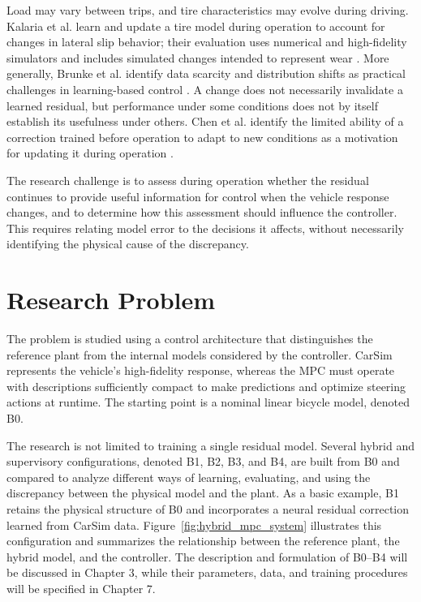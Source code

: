 \documentclass[12pt,a4paper]{report}
\begin{document}
Load may vary between trips, and tire characteristics may evolve during driving. Kalaria et al. learn and update a tire model during operation to account for changes in lateral slip behavior; their evaluation uses numerical and high-fidelity simulators and includes simulated changes intended to represent wear \cite{Kalaria2024Adaptive}. More generally, Brunke et al. identify data scarcity and distribution shifts as practical challenges in learning-based control \cite{Brunke2022Safe}. A change does not necessarily invalidate a learned residual, but performance under some conditions does not by itself establish its usefulness under others. Chen et al. identify the limited ability of a correction trained before operation to adapt to new conditions as a motivation for updating it during operation \cite{Chen2026Hybrid}.

The research challenge is to assess during operation whether the residual continues to provide useful information for control when the vehicle response changes, and to determine how this assessment should influence the controller. This requires relating model error to the decisions it affects, without necessarily identifying the physical cause of the discrepancy.


\section{Research Problem}

The problem is studied using a control architecture that distinguishes the reference plant from the internal models considered by the controller. CarSim represents the vehicle's high-fidelity response, whereas the MPC must operate with descriptions sufficiently compact to make predictions and optimize steering actions at runtime. The starting point is a nominal linear bicycle model, denoted B0.

The research is not limited to training a single residual model. Several hybrid and supervisory configurations, denoted B1, B2, B3, and B4, are built from B0 and compared to analyze different ways of learning, evaluating, and using the discrepancy between the physical model and the plant. As a basic example, B1 retains the physical structure of B0 and incorporates a neural residual correction learned from CarSim data. Figure~\ref{fig:hybrid_mpc_system} illustrates this configuration and summarizes the relationship between the reference plant, the hybrid model, and the controller. The description and formulation of B0--B4 will be discussed in Chapter 3, while their parameters, data, and training procedures will be specified in Chapter 7.
\end{document}
